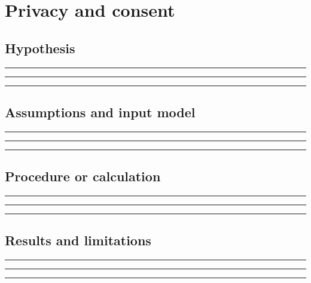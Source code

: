 \documentclass[11pt]{article}
\begin{document}
\section{Privacy and consent}

\subsection{Hypothesis}
\noindent\rule{\linewidth}{0.35pt}\par\vspace{0.22in}
\noindent\rule{\linewidth}{0.35pt}\par\vspace{0.22in}
\noindent\rule{\linewidth}{0.35pt}\par\vspace{0.18in}

\subsection{Assumptions and input model}
\noindent\rule{\linewidth}{0.35pt}\par\vspace{0.22in}
\noindent\rule{\linewidth}{0.35pt}\par\vspace{0.22in}
\noindent\rule{\linewidth}{0.35pt}\par\vspace{0.18in}

\subsection{Procedure or calculation}
\noindent\rule{\linewidth}{0.35pt}\par\vspace{0.22in}
\noindent\rule{\linewidth}{0.35pt}\par\vspace{0.22in}
\noindent\rule{\linewidth}{0.35pt}\par\vspace{0.18in}

\subsection{Results and limitations}
\noindent\rule{\linewidth}{0.35pt}\par\vspace{0.22in}
\noindent\rule{\linewidth}{0.35pt}\par\vspace{0.22in}
\noindent\rule{\linewidth}{0.35pt}\par\vspace{0.18in}
\end{document}
